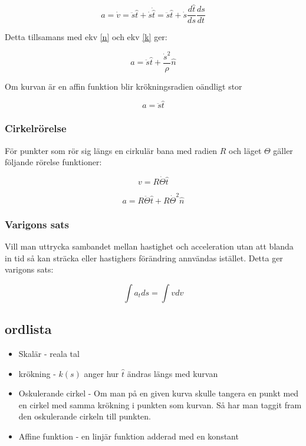 \documentclass[a4paper,12pt]{article}
\begin{document}
\begin{equation}
a = \dot{v} = \ddot{s}\hat{t} +  \dot{s}\dot{\hat{t}} 
  = \ddot{s}\hat{t} +  \dot{s}\frac{d\hat{t}}{ds}\frac{ds}{dt}
\end{equation}

Detta tillsamans med ekv \ref{n} och ekv \ref{k} ger:

\begin{equation}
a = \ddot{s}\hat{t}+\frac{\dot{s}^2}{\rho}\hat{n}
\end{equation}

Om kurvan är en affin funktion blir krökningsradien oändligt stor

\begin{equation}
a = \ddot{s}\hat{t}
\end{equation}


\subsubsection{Cirkelrörelse}

För punkter som rör sig längs en cirkulär bana med radien $R$ och läget $\Theta$ 
gäller följande rörelse funktioner:

\begin{equation}
v = R\dot{\Theta}\hat{t}
\end{equation}

\begin{equation}
a = R\ddot{\Theta}\hat{t} + R\dot{\Theta}^2\hat{n}
\end{equation}

\subsubsection{Varigons sats}

Vill man uttrycka sambandet mellan hastighet och acceleration utan att blanda in tid så kan 
sträcka eller hastighers förändring annvändas istället. Detta ger varigons sats:

\begin{equation}
\int a_t ds = \int vdv
\end{equation}

\subsection{ordlista}

\begin{itemize}

  \item  Skalär - reala tal

  \item  krökning - $k(s)$ anger hur $\hat{t}$ ändras längs med kurvan

  \item  Oskulerande cirkel -  Om man på en given kurva skulle tangera 
         en punkt med en cirkel med samma krökning i punkten som kurvan.
         Så har man taggit fram den oskulerande cirkeln till punkten.

  \item Affine funktion - en linjär funktion adderad med en konstant

\end{itemize}
\end{document}
